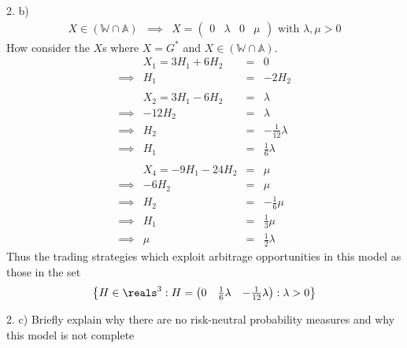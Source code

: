 \documentclass[11pt,a4paper]{article}
\begin{document}
\begin{answer}{2. b)}
\[\begin{array}{rcl}
    X\in(\mathbb{W}\cap\mathbb{A})&\implies&X=\begin{pmatrix}0&\lambda&0&\mu\end{pmatrix}\text{ with }\lambda,\mu>0
  \end{array}\]
  How consider the $X$s where $X=G^*$ and $X\in(\mathbb{W}\cap\mathbb{A})$.
  \[\begin{array}{rrcl}
    &X_1=3H_1+6H_2&=&0\\
    \implies&H_1&=&-2H_2\\\\
    &X_2=3H_1-6H_2&=&\lambda\\
    \implies&-12H_2&=&\lambda\\
    \implies&H_2&=&-\frac1{12}\lambda\\
    \implies&H_1&=&\frac16\lambda\\\\
    &X_4=-9H_1-24H_2&=&\mu\\
    \implies&-6H_2&=&\mu\\
    \implies&H_2&=&-\frac16\mu\\
    \implies&H_1&=&\frac13\mu\\
    \implies&\mu&=&\frac12\lambda
  \end{array}\]
  Thus the trading strategies which exploit arbitrage opportunities in this model as those in the set
  \[ \left\{H\in\reals^3:H=\begin{pmatrix}0&\frac16\lambda&-\frac1{12}\lambda\end{pmatrix}:\lambda>0\right\} \]
\end{answer}

\begin{question}{2. c)}
  Briefly explain why there are no risk-neutral probability measures and why this model is not complete
\end{question}
\end{document}
